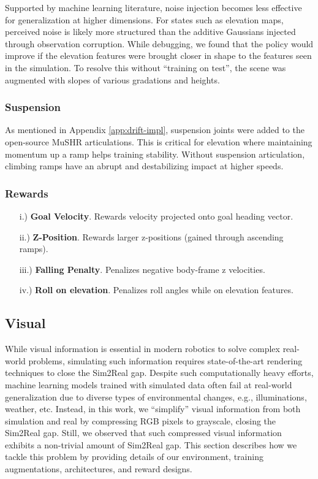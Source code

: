 \begin{appendices}
Supported by machine learning literature, noise injection becomes less effective for generalization at higher dimensions. For states such as elevation maps, perceived noise is likely more structured than the additive Gaussians injected through observation corruption. While debugging, we found that the policy would improve if the elevation features were brought closer in shape to the features seen in the simulation. To resolve this without ``training on test'', the scene was augmented with slopes of various gradations and heights.

\subsubsection{Suspension}

As mentioned in Appendix \ref{app:drift-impl}, suspension joints were added to the open-source MuSHR articulations. This is critical for elevation where maintaining momentum up a ramp helps training stability. Without suspension articulation, climbing ramps have an abrupt and destabilizing impact at higher speeds.

\subsubsection{Rewards}
\begin{enumerate}
    \item[i.)] \textbf{Goal Velocity}. Rewards velocity projected onto goal heading vector.
    \item[ii.)] \textbf{Z-Position}. Rewards larger z-positions (gained through ascending ramps).
    \item[iii.)] \textbf{Falling Penalty}. Penalizes negative body-frame z velocities.
    \item[iv.)] \textbf{Roll on elevation}. Penalizes roll angles while on elevation features.
\end{enumerate}

\subsection{Visual}\label{app:vis}
While visual information is essential in modern robotics to solve complex real-world problems, simulating such information requires state-of-the-art rendering techniques to close the Sim2Real gap.
Despite such computationally heavy efforts, machine learning models trained with simulated data often fail at real-world generalization due to diverse types of environmental changes, e.g., illuminations, weather, etc.
Instead, in this work, we ``simplify'' visual information from both simulation and real by compressing RGB pixels to grayscale, closing the Sim2Real gap.
Still, we observed that such compressed visual information exhibits a non-trivial amount of Sim2Real gap.
This section describes how we tackle this problem by providing details of our environment, training augmentations, architectures, and reward designs.


\end{appendices}
